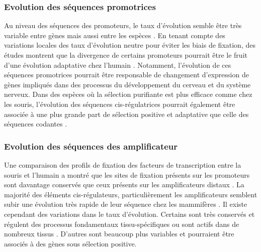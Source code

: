 \subsubsection{Evolution des séquences promotrices}
\label{subsubsec:evol-seq-promo}

Au niveau des séquences des promoteurs, le taux d’évolution semble être très variable entre gènes mais aussi entre les espèces \citep{taylor_heterotachy_2006}. En tenant compte des variations locales des taux d'évolution neutre pour éviter les biais de fixation, des études montrent que la divergence de certains promoteurs pourrait être le fruit d’une évolution adaptative chez l’humain \citep{haygood_promoter_2007, torgerson_evolutionary_2009}. Notamment, l’évolution de ces séquences promotrices pourrait être responsable de changement d’expression de gènes impliqués dans des processus du développement du cerveau et du système nerveux. Dans des espèces où la sélection purifiante est plus efficace comme chez les souris, l’évolution des séquences \gls{cis}-régulatrices pourrait également être associée à une plus grande part de sélection positive et adaptative que celle des séquences codantes \citep{halligan_contributions_2013}.

\subsubsection{Evolution des séquences des amplificateur}
\label{subsubsec:evol-seq-enh}

Une comparaison des profils de fixation des facteurs de transcription entre la souris et l’humain a montré que les sites de fixation présents sur les promoteurs sont davantage conservés que ceux présents sur les \glspl{amplificateur} distaux \citep{cheng_principles_2014}. La majorité des éléments \gls{cis}-régulateurs, particulièrement les \glspl{amplificateur} semblent subir une évolution très rapide de leur séquence chez les mammifères \citep{villar_enhancer_2015}. Il existe cependant des variations dans le taux d’évolution. Certains sont très conservés et régulent des processus fondamentaux tissu-spécifiques \citep{ballester_multi-species_2014} ou sont actifs dans de nombreux tissus \citep{cheng_principles_2014}. D’autres sont beaucoup plus variables et pourraient être associés à des gènes sous sélection positive. \\

